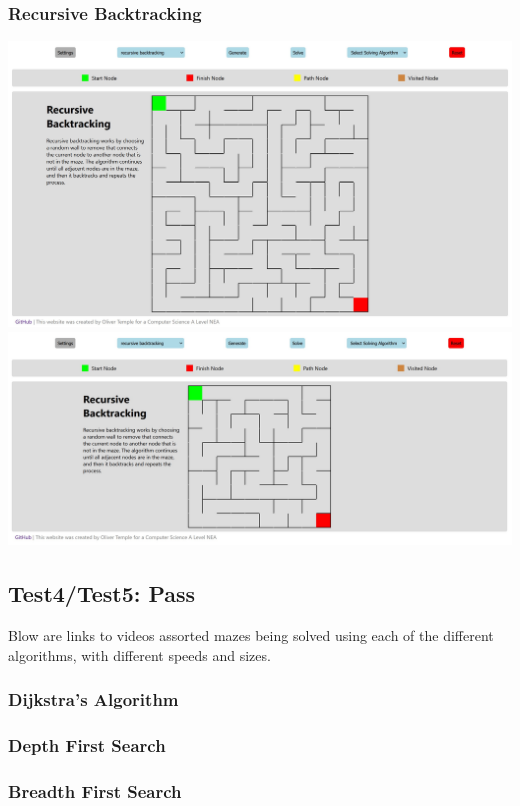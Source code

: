 \documentclass{article}
\begin{document}
\subsubsection{Recursive Backtracking}
\includegraphics[width=\linewidth]{assets/testing/test3c.jpg}
\includegraphics[width=\linewidth]{assets/testing/test3d.jpg}

\subsection{Test4/Test5: Pass}
Blow are links to videos assorted mazes being solved using each of the different algorithms, with different speeds and sizes.
\subsubsection{Dijkstra's Algorithm}

\subsubsection{Depth First Search}

\subsubsection{Breadth First Search}
\end{document}
